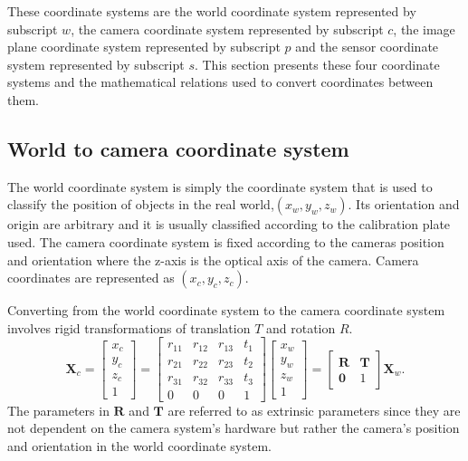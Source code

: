 \documentclass[12pt,oneside,openany,a4paper, %
english, %
masters-t, goldenblock]{usthesis}
\begin{document}
These coordinate systems are the world coordinate system represented by subscript $w$, the camera coordinate system represented by subscript $c$, the image plane coordinate system represented by subscript $p$ and the sensor coordinate system represented by subscript $s$. This section presents these four coordinate systems and the mathematical relations used to convert coordinates between them.

\subsection{World to camera coordinate system}
The world coordinate system is simply the coordinate system that is used to classify the position of objects in the real world,$(x_w, y_w, z_w)$. Its orientation and origin are arbitrary and it is usually classified according to the calibration plate used.  The camera coordinate system is fixed according to the cameras position and orientation where the z-axis is the optical axis of the camera. Camera coordinates are represented as $(x_c, y_c, z_c)$.

Converting from the world coordinate system to the camera coordinate system involves rigid transformations of translation $T$ and rotation $R$. 
\begin{equation}
\label{eq: world2camera}
  \bm{X}_c = 
  \begin{bmatrix}
  x_c \\
  y_c \\
  z_c \\
  1
  \end{bmatrix}
  =
  \begin{bmatrix}
  r_{11} & r_{12} & r_{13} & t_1 \\
  r_{21} & r_{22} & r_{23} & t_2 \\
  r_{31} & r_{32} & r_{33} & t_3 \\
  0 & 0 & 0 & 1
  \end{bmatrix}
  \begin{bmatrix}
  x_w \\
  y_w \\
  z_w \\
  1
  \end{bmatrix} = 
  \begin{bmatrix}
  \bm{R} & \bm{T} \\
  \bm{0} & 1
  \end{bmatrix} \bm{X}_w.
\end{equation}
The parameters in $\bm{R}$ and $\bm{T}$ are referred to as extrinsic parameters since they are not dependent on the camera system's hardware but rather the camera's position and orientation in the world coordinate system.
\end{document}
